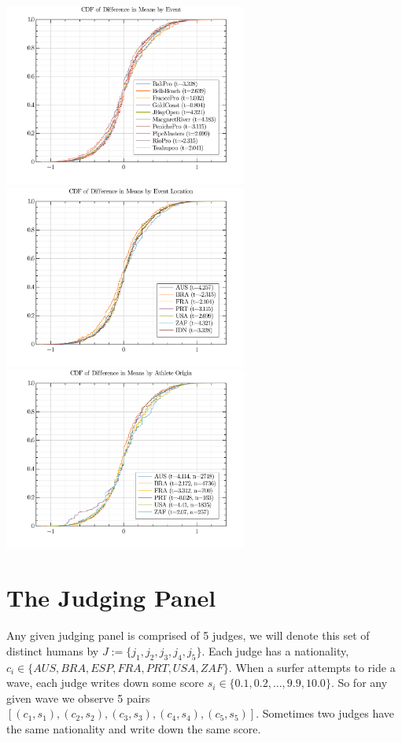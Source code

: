 \documentclass{article}
\theoremstyle{definition}
\begin{document}
\includegraphics[width=8cm]{./src/visuals/DiffInMeansCDFbyevent.png}
\includegraphics[width=8cm]{./src/visuals/DiffInMeansCDFbyeventOrig.png}
\includegraphics[width=8cm]{./src/visuals/DiffInMeansCDFbyathOrig.png}

\section{The Judging Panel}
Any given judging panel is comprised of 5 judges, we will denote this set of distinct humans by $J:=\{j_1,j_2,j_3,j_4,j_5\}$. Each judge has a nationality, $c_i \in \{AUS,BRA,ESP,FRA,PRT,USA,ZAF\}$. When a surfer attempts to ride a wave, each judge writes down some score $s_i \in \{0.1,0.2,\dots,9.9,10.0\}$. So for any given wave we observe 5 pairs $[(c_1,s_1),(c_2,s_2),(c_3,s_3),(c_4,s_4),(c_5,s_5)]$. Sometimes two judges have the same nationality and write down the same score. 
\end{document}
